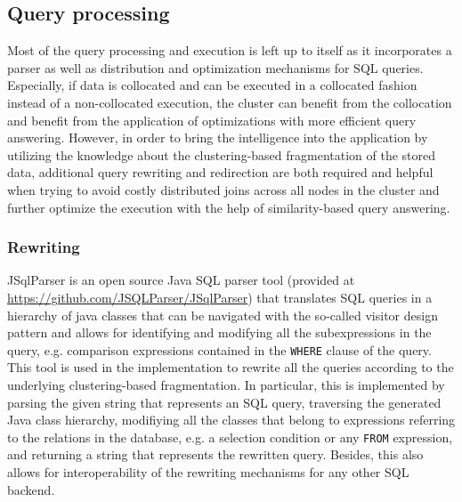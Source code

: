 \subsection{Query processing}
\label{sec:impl_qpro}

Most of the query processing and execution is left up to  itself as it incorporates a parser as well as distribution and optimization
mechanisms for SQL queries. Especially, if data is collocated and can be executed in a collocated fashion instead of a non-collocated execution, the cluster 
can benefit from the collocation and benefit from the application of optimizations with more efficient query answering. However, in order to bring the
intelligence into the application by utilizing the knowledge about the clustering-based fragmentation of the stored data, additional query rewriting and
redirection are both required and helpful when trying to avoid costly distributed joins across all nodes in the cluster and further optimize the execution 
with the help of similarity-based query answering.

\subsubsection{Rewriting}
\label{sec:impl_qpro_rewr}

JSqlParser is an open source Java SQL parser tool (provided at \url{https://github.com/JSQLParser/JSqlParser}) that translates SQL queries in a hierarchy 
of java classes that can be navigated with the so-called visitor design pattern \cite[pp.~331ff.]{Gamma1994} and allows for identifying and modifying all the
subexpressions in the query, e.g. comparison expressions contained in the \verb!WHERE! clause of the query. This tool is used in the implementation 
to rewrite all the queries according to the underlying clustering-based fragmentation. In particular, this is implemented by parsing the given string that 
represents an SQL query, traversing the generated Java class hierarchy, modifiying all the classes that belong to expressions referring to the relations in
the database, e.g. a selection condition or any \verb!FROM! expression, and returning a string that represents the rewritten query. Besides, this also allows
for interoperability of the rewriting mechanisms for any other SQL backend. 

